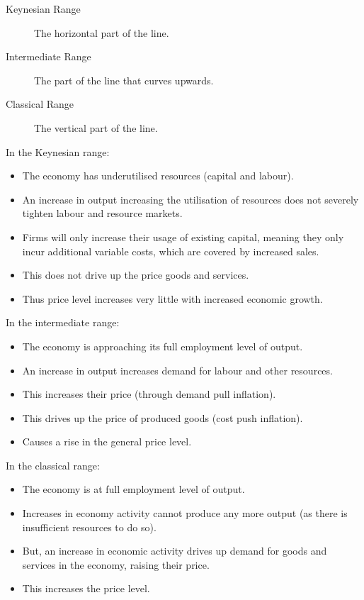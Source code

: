 \documentclass[a4paper,11pt]{article}
\begin{document}
\begin{description}
\item [Keynesian Range] The horizontal part of the line.
\item [Intermediate Range] The part of the line that curves upwards.
\item [Classical Range] The vertical part of the line.
\end{description}

In the Keynesian range:

\begin{itemize}
\item The economy has underutilised resources (capital and labour).
\item An increase in output increasing the utilisation of resources does not
	severely tighten labour and resource markets.
\item Firms will only increase their usage of existing capital, meaning they
	only incur additional variable costs, which are covered by increased sales.
\item This does not drive up the price goods and services.
\item Thus price level increases very little with increased economic growth.
\end{itemize}

In the intermediate range:

\begin{itemize}
\item The economy is approaching its full employment level of output.
\item An increase in output increases demand for labour and other resources.
\item This increases their price (through demand pull inflation).
\item This drives up the price of produced goods (cost push inflation).
\item Causes a rise in the general price level.
\end{itemize}

In the classical range:

\begin{itemize}
\item The economy is at full employment level of output.
\item Increases in economy activity cannot produce any more output (as there is
	insufficient resources to do so).
\item But, an increase in economic activity drives up demand for goods and
	services in the economy, raising their price.
\item This increases the price level.
\end{itemize}
\end{document}
